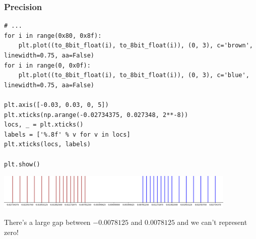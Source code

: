 \documentclass{beamer}
\begin{document}
\begin{frame}[fragile]
\frametitle{Precision}

\tiny

\begin{lstlisting}
# ...
for i in range(0x80, 0x8f):
    plt.plot((to_8bit_float(i), to_8bit_float(i)), (0, 3), c='brown', linewidth=0.75, aa=False)
for i in range(0, 0x0f):
    plt.plot((to_8bit_float(i), to_8bit_float(i)), (0, 3), c='blue', linewidth=0.75, aa=False)

plt.axis([-0.03, 0.03, 0, 5])
plt.xticks(np.arange(-0.02734375, 0.027348, 2**-8))
locs, _ = plt.xticks()
labels = ['%.8f' % v for v in locs]
plt.xticks(locs, labels)

plt.show()
\end{lstlisting}

\begin{center}
  \includegraphics[width=11.5cm]{float_near_zero1.png}
\end{center}

\scriptsize

There's a large gap between $-0.0078125$ and $0.0078125$ and we can't represent zero!

\end{frame}
\end{document}
